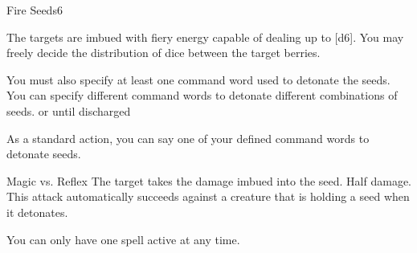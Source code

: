 \begin{spellsection}{Fire Seeds}{6}
    \begin{spellheader}
    \end{spellheader}
    \begin{spellcontent}
        \begin{spelltargetinginfo}
        \end{spelltargetinginfo}
        \begin{spelleffects}
            \spelleffect The targets are imbued with fiery energy capable of dealing up to [d6]. You may freely decide the distribution of dice between the target berries.

            You must also specify at least one command word used to detonate the seeds. You can specify different command words to detonate different combinations of seeds.
            \spelldur \durext or until discharged
        \end{spelleffects}
    \end{spellcontent}
    \begin{spellsubcontent}
        \begin{spelltargetinginfo}
            \spellspecial As a standard action, you can say one of your defined command words to detonate seeds.
            \spellrng{\rngmed}
        \end{spelltargetinginfo}
        \begin{spelleffects}
            \begin{spellattack}{Magic vs. Reflex}
                \spellsuccess The target takes the damage imbued into the seed.
                \spellfailure Half damage.
                \spellspecial This attack automatically succeeds against a creature that is holding a seed when it detonates.
            \end{spellattack}
        \end{spelleffects}
    \end{spellsubcontent}
    \begin{spellfooter}
        \spellnotes You can only have one  spell active at any time.
        \miscastexplode
    \end{spellfooter}
\end{spellsection}


